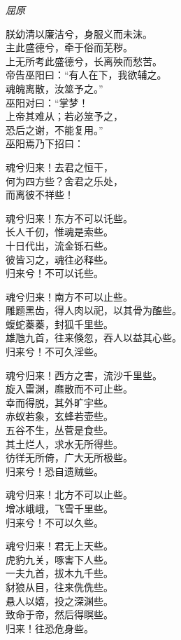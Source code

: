\documentclass[]{article}
\begin{document}
\emph{屈原}

朕幼清以廉洁兮，身服义而未沫。\\
主此盛德兮，牵于俗而芜秽。\\
上无所考此盛德兮，长离殃而愁苦。\\
帝告巫阳曰：``有人在下，我欲辅之。\\
魂魄离散，汝筮予之。''\\
巫阳对曰：``掌梦！\\
上帝其难从；若必筮予之，\\
恐后之谢，不能复用。''\\
巫阳焉乃下招曰：

魂兮归来！去君之恒干，\\
何为四方些？舍君之乐处，\\
而离彼不祥些！

魂兮归来！东方不可以讬些。\\
长人千仞，惟魂是索些。\\
十日代出，流金铄石些。\\
彼皆习之，魂往必释些。\\
归来兮！不可以讬些。

魂兮归来！南方不可以止些。\\
雕题黑齿，得人肉以祀，以其骨为醢些。\\
蝮蛇蓁蓁，封狐千里些。\\
雄虺九首，往来倏忽，吞人以益其心些。\\
归来兮！不可久淫些。

魂兮归来！西方之害，流沙千里些。\\
旋入雷渊，爢散而不可止些。\\
幸而得脱，其外旷宇些。\\
赤蚁若象，玄蜂若壶些。\\
五谷不生，丛菅是食些。\\
其土烂人，求水无所得些。\\
彷徉无所倚，广大无所极些。\\
归来兮！恐自遗贼些。

魂兮归来！北方不可以止些。\\
增冰峨峨，飞雪千里些。\\
归来兮！不可以久些。

魂兮归来！君无上天些。\\
虎豹九关，啄害下人些。\\
一夫九首，拔木九千些。\\
豺狼从目，往来侁侁些。\\
悬人以嬉，投之深渊些。\\
致命于帝，然后得瞑些。\\
归来！往恐危身些。
\end{document}
